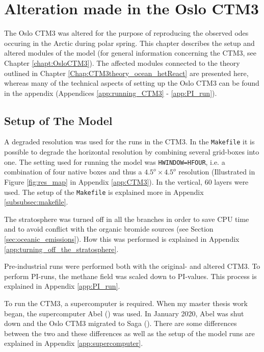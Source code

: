 \setcounter{chapter}{4}
\chapter{Alteration made in the Oslo CTM3}\label{chap:CTM3_Setup}

The Oslo CTM3 was altered for the purpose of reproducing the observed \acrshort{ode}s occuring in the Arctic during polar spring. This chapter describes the setup and altered modules of the model (for general information concerning the CTM3, see Chapter \ref{chapt:OsloCTM3}). The affected modules connected to the theory outlined in Chapter \ref{Chap:CTM3theory_ocean_hetReact} are presented here, whereas many of the technical aspects of setting up the Oslo CTM3 can be found in the appendix (Appendices \ref{app:running_CTM3} - \ref{app:PI_run}).

\section{Setup of The Model}

A degraded resolution was used for the runs in the CTM3. In the \texttt{Makefile} it is possible to degrade the horizontal resolution by combining several grid-boxes into one. The setting used for running the model was \texttt{HWINDOW=HFOUR}, i.e. a combination of four native boxes and thus a $4.5^o \times 4.5^o$ resolution (Illustrated in Figure \ref{fig:res_map} in Appendix \ref{app:CTM3}). In the vertical, 60 layers were used. The setup of the \texttt{Makefile} is explained more in Appendix \ref{subsubsec:makefile}. 

\medskip

The stratosphere was turned off in all the branches in order to save CPU time and to avoid conflict with the organic bromide sources (see Section \ref{sec:oceanic_emissions}). How this was performed is explained in Appendix \ref{app:turning_off_the_stratosphere}. 

\medskip

Pre-industrial runs were performed both with the original- and altered CTM3. To perform PI-runs, the methane field was scaled down to PI-values. This process is explained in Appendix \ref{app:PI_run}.

\medskip

To run the CTM3, a supercomputer is required. When my master thesis work began, the supercomputer Abel (\cite{abel}) was used. In January 2020, Abel was shut down and the Oslo CTM3 migrated to Saga (\cite{saga}). There are some differences between the two  and these differences as well as the setup of the model runs are explained in Appendix \ref{app:supercomputer}. 


